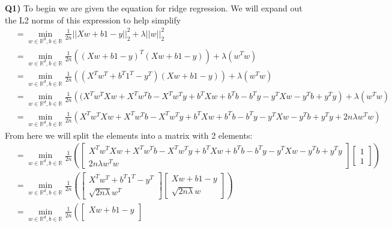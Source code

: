 \documentclass{article}
\begin{document}
\begin{titlepage}
\vspace{0.5cm}
\textbf{Q1)} To begin we are given the equation for ridge regression. We will expand out the L2 norms of this expression to help simplify
\begin{align*} 
&= \displaystyle \min_{w \in \mathbb{R}^d, b \in \mathbb{R}} \frac{1}{2n}||Xw + b1 - y||^2_2 + \lambda||w||^2_2 \\
&= \displaystyle \min_{w \in \mathbb{R}^d, b \in \mathbb{R}} 
\frac{1}{2n} \left( (Xw + b1 - y)^T(Xw + b1 - y) \right) + \lambda \left( w^Tw \right) \\
&= \displaystyle \min_{w \in \mathbb{R}^d, b \in \mathbb{R}} 
\frac{1}{2n} \left( (X^Tw^T + b^T1^T - y^T)(Xw + b1 - y) \right) + \lambda \left( w^Tw \right) \\
&= \displaystyle \min_{w \in \mathbb{R}^d, b \in \mathbb{R}} 
\frac{1}{2n} \left( (X^Tw^TXw + X^Tw^Tb - X^Tw^Ty +b^TXw+ b^Tb -b^Ty -y^TXw -y^Tb + y^Ty \right) + \lambda \left( w^Tw \right) \\
&= \displaystyle \min_{w \in \mathbb{R}^d, b \in \mathbb{R}} 
\frac{1}{2n} \left( X^Tw^TXw + X^Tw^Tb - X^Tw^Ty +b^TXw+ b^Tb -b^Ty -y^TXw -y^Tb + y^Ty + 2n\lambda w^Tw \right)
\end{align*}
From here we will split the elements into a matrix with 2 elements:
\begin{align*} 
&= \displaystyle \min_{w \in \mathbb{R}^d, b \in \mathbb{R}} \frac{1}{2n} \left(
\begin{bmatrix}
X^Tw^TXw + X^Tw^Tb - X^Tw^Ty +b^TXw+ b^Tb -b^Ty -y^TXw -y^Tb + y^Ty\\
2n\lambda w^Tw 
\end{bmatrix} \begin{bmatrix}
1\\
1
\end{bmatrix} \right)  \\
&= \displaystyle \min_{w \in \mathbb{R}^d, b \in \mathbb{R}} \frac{1}{2n} \left(
\begin{bmatrix}
X^Tw^T + b^T1^T - y^T\\
\sqrt{2n\lambda} w^T
\end{bmatrix}
\begin{bmatrix}
Xw + b1 - y\\
\sqrt{2n\lambda} w 
\end{bmatrix} \right)  \\
&= \displaystyle \min_{w \in \mathbb{R}^d, b \in \mathbb{R}} \frac{1}{2n} \left(
\begin{bmatrix}
Xw + b1 - y\\

\end{bmatrix}
\end{align*}
\end{titlepage}
\end{document}
